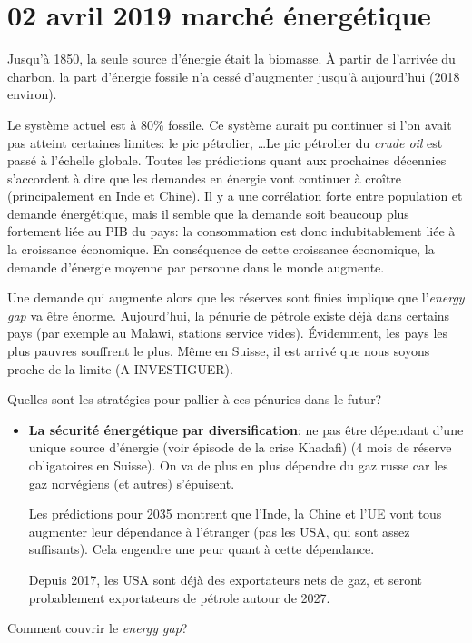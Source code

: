 \documentclass{article}
\begin{document}
\section*{02 avril 2019 \quad marché énergétique}
	Jusqu'à 1850, la seule source d'énergie était la biomasse. À partir de l'arrivée du charbon, la part d'énergie fossile n'a cessé d'augmenter jusqu'à aujourd'hui (2018 environ). \par
	Le système actuel est à 80\% fossile. Ce système aurait pu continuer si l'on avait pas atteint certaines limites: le pic pétrolier, \dots Le pic pétrolier du \emph{crude oil} est passé à l'échelle globale. Toutes les prédictions quant aux prochaines décennies s'accordent à dire que les demandes en énergie vont continuer à croître (principalement en Inde et Chine). Il y a une corrélation forte entre population et demande énergétique, mais il semble que la demande soit beaucoup plus fortement liée au PIB du pays: la consommation est donc indubitablement liée à la croissance économique. En conséquence de cette croissance économique, la demande d'énergie moyenne par personne dans le monde augmente. \par
	Une demande qui augmente alors que les réserves sont finies implique que l'\emph{energy gap} va être énorme. Aujourd'hui, la pénurie de pétrole existe déjà dans certains pays (par exemple au Malawi, stations service vides). Évidemment, les pays les plus pauvres souffrent le plus. Même en Suisse, il est arrivé que nous soyons proche de la limite (A INVESTIGUER). \par
	Quelles sont les stratégies pour pallier à ces pénuries dans le futur?
	\begin{itemize}
		\item \textbf{La sécurité énergétique par diversification}: ne pas être dépendant d'une unique source d'énergie (voir épisode de la crise Khadafi) (4 mois de réserve obligatoires en Suisse). On va de plus en plus dépendre du gaz russe car les gaz norvégiens (et autres) s'épuisent. \par
		Les prédictions pour 2035 montrent que l'Inde, la Chine et l'UE vont tous augmenter leur dépendance à l'étranger (pas les USA, qui sont assez suffisants). Cela engendre une peur quant à cette dépendance. \par
		Depuis 2017, les USA sont déjà des exportateurs nets de gaz, et seront probablement exportateurs de pétrole autour de 2027. 
	\end{itemize}
	Comment couvrir le \emph{energy gap}?
\end{document}
